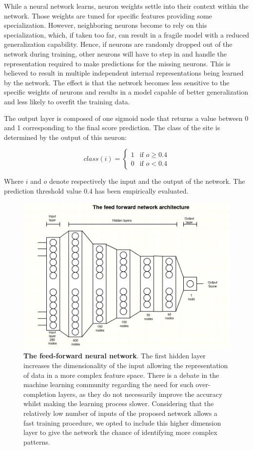 While a neural network learns, neuron weights settle into their context within the network. Those weights are tuned for specific features providing some specialization. However, neighboring neurons become to rely on this specialization, which, if taken too far, can result in a fragile model with a reduced generalization capability. Hence, if neurons are randomly dropped out of the network during training, other neurons will have to step in and handle the representation required to make predictions for the missing neurons. This is believed to result in multiple independent internal representations being learned by the network. The effect is that the network becomes less sensitive to the specific weights of neurons and results in a model capable of better generalization and less likely to overfit the training data.    

The output layer is composed of one sigmoid node that returns a value between 0 and 1 corresponding to the final score prediction. The class of the site is determined by the output of this neuron:

\[class(i) = 
\begin{cases} 
	1 & \text{if } o \geq 0.4 \\
	0 & \text{if } o < 0.4
\end{cases}
\]

Where $i$ and $o$ denote respectively the input and the output of the network. The prediction threshold value $0.4$ has been empirically evaluated. 


\begin{figure}[hbt!]
	\centering
	\includegraphics[width=\textwidth, height=0.52\textheight]{Figures/NN}
	\caption{\textbf{The feed-forward neural network}. The first hidden layer increases the dimensionality of the input allowing the representation of data in a more complex feature space. There is a debate in the machine learning community regarding the need for such over-completion layers, as they do not necessarily improve the accuracy whilst making the learning process slower. Considering that the relatively low number of inputs of the proposed network allows a fast training procedure, we opted to include this higher dimension layer to give the network the chance of identifying more complex patterns.}
	\label{fig:NN}
\end{figure}

